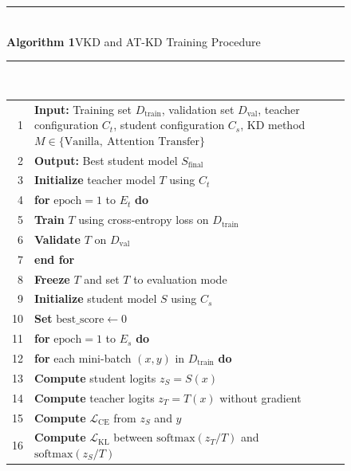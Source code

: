 \documentclass[preprint,review,12pt]{elsarticle}
\begin{document}
\begin{figure}[tbp]
\centering
\rule{\columnwidth}{0.9pt}\\[1pt]
{\footnotesize\textbf{Algorithm 1}\quad VKD and AT-KD Training Procedure}\\[2pt]
\rule{\columnwidth}{0.4pt}\\[1pt]
\footnotesize
\setlength{\tabcolsep}{3pt}
\renewcommand{\arraystretch}{1.15}
\begin{tabular}{@{}r@{\ \ }p{}@{}}
1  & \textbf{Input:} Training set $D_{\text{train}}$, validation set $D_{\text{val}}$, teacher configuration $C_{t}$, student configuration $C_{s}$, KD method $M \in \{\text{Vanilla},\ \text{Attention Transfer}\}$ \\
2  & \textbf{Output:} Best student model $S_{\text{final}}$ \\
3  & \textbf{Initialize} teacher model $T$ using $C_{t}$ \\
4  & \textbf{for} $\text{epoch} = 1$ to $E_{t}$ \textbf{do} \\
5  & \hspace{1.5em}\textbf{Train} $T$ using cross-entropy loss on $D_{\text{train}}$ \\
6  & \hspace{1.5em}\textbf{Validate} $T$ on $D_{\text{val}}$ \\
7  & \textbf{end for} \\
8  & \textbf{Freeze} $T$ and set $T$ to evaluation mode \\
9  & \textbf{Initialize} student model $S$ using $C_{s}$ \\
10 & \textbf{Set} $\text{best\_score} \leftarrow 0$ \\
11 & \textbf{for} $\text{epoch} = 1$ to $E_{s}$ \textbf{do} \\
12 & \hspace{1.5em}\textbf{for} each mini-batch $(x, y)$ in $D_{\text{train}}$ \textbf{do} \\
13 & \hspace{3em}\textbf{Compute} student logits $z_{S} = S(x)$ \\
14 & \hspace{3em}\textbf{Compute} teacher logits $z_{T} = T(x)$ without gradient \\
15 & \hspace{3em}\textbf{Compute} $\mathcal{L}_{\text{CE}}$ from $z_{S}$ and $y$ \\
16 & \hspace{3em}\textbf{Compute} $\mathcal{L}_{\text{KL}}$ between $\text{softmax}(z_{T}/T)$ and $\text{softmax}(z_{S}/T)$ \\

\end{tabular}
\end{figure}
\end{document}
